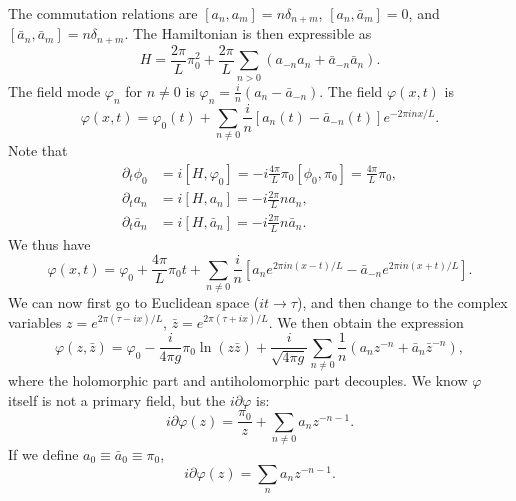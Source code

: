 \documentclass[aps,prb,superscriptaddress,nofootinbib]{revtex4}
\begin{document}
The commutation relations are $\left[a_{n}, a_{m}\right]=n \delta_{n+m}$, $\left[a_{n}, \bar{a}_{m}\right]=0$, and $\left[\bar{a}_{n}, \bar{a}_{m}\right]=n \delta_{n+m}$.
The Hamiltonian is then expressible as
\begin{equation}
	H=\frac{2\pi}{L} \pi_{0}^{2}+\frac{2 \pi}{L} \sum_{n > 0}\left(a_{-n} a_{n}+\bar{a}_{-n} \bar{a}_{n}\right).
\end{equation}
The field mode $\varphi_n$ for $n\ne 0$ is $\varphi_n = \frac{i}{n} (a_n-\bar a_{-n})$.
The field $\varphi(x,t)$ is
\begin{equation}
	\varphi(x,t) = \varphi_0(t) + \sum_{n\ne 0} \frac{i}{n} \left[a_n(t)-\bar a_{-n}(t)\right] e^{-2\pi i n x/L}.
\end{equation}
Note that
\begin{equation}
\begin{aligned}
	\partial_t \phi_0 &= i [H,\varphi_0] = -i\frac{4\pi}{L} \pi_0 [\phi_0, \pi_0] = \frac{4\pi}{L}\pi_0, \\
	\partial_t a_n &= i[H, a_n] = -i \frac{2\pi}{L} n a_n, \\
	\partial_t \bar a_n &= i[H, \bar a_n] = -i \frac{2\pi}{L} n \bar a_n.
\end{aligned}
\end{equation}
We thus have
\begin{equation}
	\varphi(x, t)=\varphi_{0}+\frac{4\pi}{L} \pi_{0} t + \sum_{n \neq 0} \frac{i}{n}\left[a_{n} e^{2 \pi i n(x-t) / L}-\bar{a}_{-n} e^{2 \pi i n(x+t) / L}\right].
\end{equation}
We can now first go to Euclidean space ($it \rightarrow \tau$), and then change to the complex variables $z = e^{2\pi(\tau-ix)/L}$, $\bar z = e^{2\pi(\tau+ix)/L}$.
We then obtain the expression
\begin{equation}
	\varphi(z, \bar{z})=\varphi_{0}-\frac{i}{4 \pi g} \pi_{0} \ln (z \bar{z})+\frac{i}{\sqrt{4 \pi g}} \sum_{n \neq 0} \frac{1}{n}\left(a_{n} z^{-n}+\bar{a}_{n} \bar{z}^{-n}\right),
\end{equation}
where the holomorphic part and antiholomorphic part decouples.
We know $\varphi$ itself is not a primary field, but the $i\partial\varphi$ is:
\begin{equation}
	i\partial\varphi(z) = \frac{\pi_0}{z} + \sum_{n\ne 0} a_n z^{-n-1}.
\end{equation}
If we define $a_0 \equiv \bar a_0 \equiv \pi_0$,
\begin{equation}
	i\partial\varphi(z) = \sum_n a_n z^{-n-1}.
\end{equation}
\end{document}
